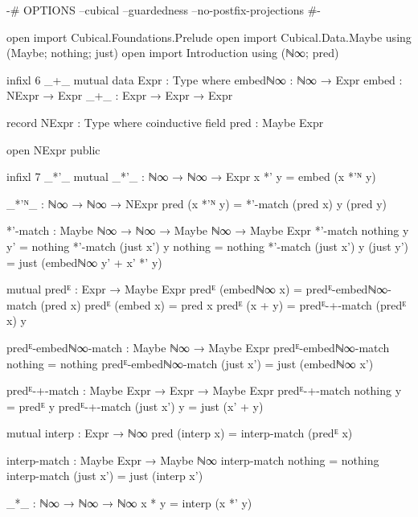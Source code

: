 \begin{code}
{-# OPTIONS --cubical --guardedness --no-postfix-projections #-}

open import Cubical.Foundations.Prelude
open import Cubical.Data.Maybe using (Maybe; nothing; just)
open import Introduction using (ℕ∞; pred)

infixl 6 _+_
mutual
  data Expr : Type where
    embedℕ∞ : ℕ∞ → Expr
    embed : NExpr → Expr
    _+_ : Expr → Expr → Expr

  record NExpr : Type where
    coinductive
    field
      pred : Maybe Expr

open NExpr public

infixl 7 _*'_
mutual
  _*'_ : ℕ∞ → ℕ∞ → Expr
  x *' y = embed (x *'ᴺ y)

  _*'ᴺ_ : ℕ∞ → ℕ∞ → NExpr
  pred (x *'ᴺ y) = *'-match (pred x) y (pred y)

  *'-match : Maybe ℕ∞ → ℕ∞ → Maybe ℕ∞ → Maybe Expr
  *'-match nothing y y' = nothing
  *'-match (just x') y nothing = nothing
  *'-match (just x') y (just y') = just (embedℕ∞ y' + x' *' y)

mutual
  predᴱ : Expr → Maybe Expr
  predᴱ (embedℕ∞ x) = predᴱ-embedℕ∞-match (pred x)
  predᴱ (embed x) = pred x
  predᴱ (x + y) = predᴱ-+-match (predᴱ x) y

  predᴱ-embedℕ∞-match : Maybe ℕ∞ → Maybe Expr
  predᴱ-embedℕ∞-match nothing = nothing
  predᴱ-embedℕ∞-match (just x') = just (embedℕ∞ x')

  predᴱ-+-match : Maybe Expr → Expr → Maybe Expr
  predᴱ-+-match nothing y = predᴱ y
  predᴱ-+-match (just x') y = just (x' + y)

mutual
  interp : Expr → ℕ∞
  pred (interp x) = interp-match (predᴱ x)

  interp-match : Maybe Expr → Maybe ℕ∞
  interp-match nothing = nothing
  interp-match (just x') = just (interp x')

_*_ : ℕ∞ → ℕ∞ → ℕ∞
x * y = interp (x *' y)
\end{code}
